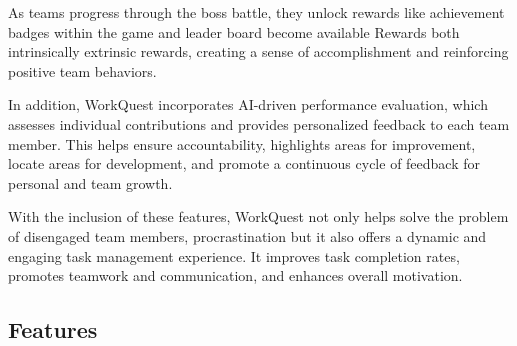 As teams progress through the boss battle, they unlock rewards like achievement badges within the game and leader board become available
Rewards both intrinsically extrinsic rewards, creating a sense of accomplishment and reinforcing positive team behaviors.

In addition, WorkQuest incorporates AI-driven performance evaluation, which assesses individual contributions and provides 
personalized feedback to each team member. This helps ensure accountability, 
highlights areas for improvement, locate areas for development, and promote a continuous cycle of feedback for personal and team growth.

With the inclusion of these features, WorkQuest not only helps solve the problem of disengaged team members, 
procrastination but it also offers a dynamic and engaging task management 
experience. It improves task completion rates, promotes teamwork and communication, and enhances overall motivation.


\subsection{Features}  
\label{subsection:features}  

